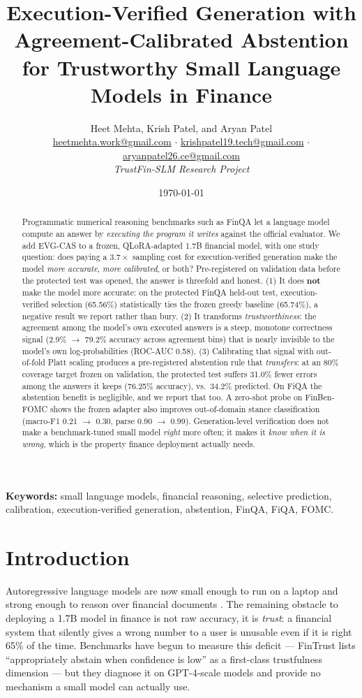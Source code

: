 \documentclass[10pt]{article}
\title{\textbf{Execution-Verified Generation with Agreement-Calibrated Abstention for Trustworthy Small Language Models in Finance}}
\author{Heet Mehta, Krish Patel, and Aryan Patel\\\small \href{mailto:heetmehta.work@gmail.com}{heetmehta.work@gmail.com} $\cdot$ \href{mailto:krishpatel19.tech@gmail.com}{krishpatel19.tech@gmail.com} $\cdot$ \href{mailto:aryanpatel26.ce@gmail.com}{aryanpatel26.ce@gmail.com}\\[2pt]\small {\em TrustFin-SLM Research Project}}
\date{\today}
\newcommand{\ourmethod}{EVG-CAS}
\begin{document}
\maketitle

\begin{abstract}
Programmatic numerical reasoning benchmarks such as FinQA let a language model compute an
answer by \emph{executing the program it writes} against the official evaluator. We add
\ourmethod{} to a frozen, QLoRA-adapted 1.7B financial model, with one study question:
does paying a $3.7\times$ sampling cost for execution-verified generation make the model
\emph{more accurate}, \emph{more calibrated}, or both? Pre-registered on validation data
before the protected test was opened, the answer is threefold and honest. (1) It does
\textbf{not} make the model more accurate: on the protected FinQA held-out test,
execution-verified selection (65.56\%) statistically ties the frozen greedy baseline
(65.74\%), a negative result we report rather than bury. (2) It transforms
\emph{trustworthiness}: the agreement among the model's own executed answers is a steep,
monotone correctness signal (2.9\% $\rightarrow$ 79.2\% accuracy across agreement bins)
that is nearly invisible to the model's own log-probabilities (ROC-AUC 0.58). (3) Calibrating
that signal with out-of-fold Platt scaling produces a pre-registered abstention rule that
\emph{transfers}: at an 80\% coverage target frozen on validation, the protected test
suffers 31.0\% fewer errors among the answers it keeps (76.25\% accuracy), vs.\ 34.2\%
predicted. On FiQA the abstention benefit is negligible, and we report that too. A zero-shot
probe on FinBen-FOMC shows the frozen adapter also improves out-of-domain stance
classification (macro-F1 0.21 $\rightarrow$ 0.30, parse 0.90 $\rightarrow$ 0.99).
Generation-level verification does not make a benchmark-tuned small model \emph{right}
more often; it makes it \emph{know when it is wrong}, which is the property finance
deployment actually needs.
\end{abstract}

\noindent\textbf{Keywords:} small language models, financial reasoning, selective prediction,
calibration, execution-verified generation, abstention, FinQA, FiQA, FOMC.

\section{Introduction}\label{sec:intro}
Autoregressive language models are now small enough to run on a laptop and strong enough to
reason over financial documents \citep{phogat2024finetuning,chen2021finqa}. The remaining
obstacle to deploying a 1.7B model in finance is not raw accuracy, it is \emph{trust}: a
financial system that silently gives a wrong number to a user is unusable even if it is
right 65\% of the time. Benchmarks have begun to measure this deficit --- FinTrust lists
``appropriately abstain when confidence is low'' as a first-class trustfulness dimension
\citep{hu2025fintrust} --- but they diagnose it on GPT-4-scale models and provide no
mechanism a small model can actually use.
\end{document}

